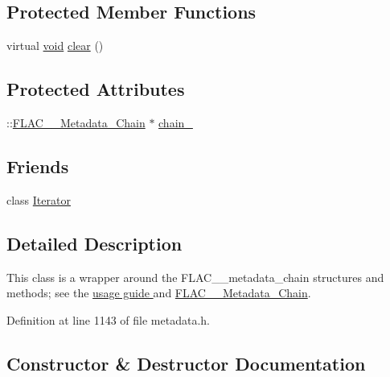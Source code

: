 \subsection*{Protected Member Functions}
\begin{DoxyCompactItemize}
\item 
virtual \hyperlink{sound_8c_ae35f5844602719cf66324f4de2a658b3}{void} \hyperlink{class_f_l_a_c_1_1_metadata_1_1_chain_a56aaa3dd67db11ae2677e909a49c35f3}{clear} ()
\end{DoxyCompactItemize}
\subsection*{Protected Attributes}
\begin{DoxyCompactItemize}
\item 
\+::\hyperlink{struct_f_l_a_c_____metadata___chain}{F\+L\+A\+C\+\_\+\+\_\+\+Metadata\+\_\+\+Chain} $\ast$ \hyperlink{class_f_l_a_c_1_1_metadata_1_1_chain_a0cf0a7dd2b2f026477833b9c9193e746}{chain\+\_\+}
\end{DoxyCompactItemize}
\subsection*{Friends}
\begin{DoxyCompactItemize}
\item 
class \hyperlink{class_f_l_a_c_1_1_metadata_1_1_chain_a9830fc407400559db7e7783cc10a9394}{Iterator}
\end{DoxyCompactItemize}


\subsection{Detailed Description}
This class is a wrapper around the F\+L\+A\+C\+\_\+\+\_\+metadata\+\_\+chain structures and methods; see the \hyperlink{group__flacpp__metadata__level2}{usage guide } and \hyperlink{struct_f_l_a_c_____metadata___chain}{F\+L\+A\+C\+\_\+\+\_\+\+Metadata\+\_\+\+Chain}. 

Definition at line 1143 of file metadata.\+h.



\subsection{Constructor \& Destructor Documentation}
